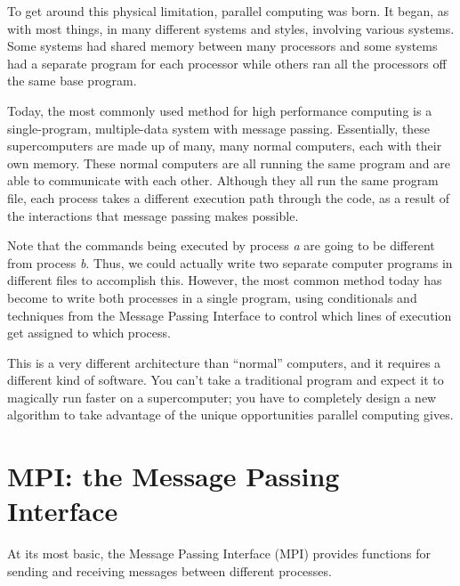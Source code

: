 To get around this physical limitation, parallel computing was born. It began, as with most things, in many different systems and styles, involving various systems. Some systems had shared memory between many processors and some systems had a separate program for each processor while others ran all the processors off the same base program.

Today, the most commonly used method for high performance computing is a single-program, multiple-data system with message passing. Essentially, these supercomputers are made up of many, many normal computers, each with their own memory. These normal computers are all running the same program and are able to communicate with each other. Although they all run the same program file, each process takes a different execution path through the code, as a result of the interactions that message passing makes possible.

Note that the commands being executed by process \emph{a} are going to be different from process \emph{b}. Thus, we could actually write two separate computer programs in different files to accomplish this. However, the most common method today has become to write both processes in a single program, using conditionals and techniques from the Message Passing Interface to control which lines of execution get assigned to which process.

This is a very different architecture than ``normal'' computers, and it requires a different kind of software. You can't take a traditional program and expect it to magically run faster on a supercomputer; you have to completely design a new algorithm to take advantage of the unique opportunities parallel computing gives.

\section*{MPI: the Message Passing Interface}
At its most basic, the Message Passing Interface (MPI) provides functions for sending and receiving messages between different processes.

